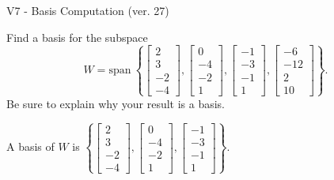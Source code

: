\begin{exercise}
  \begin{exerciseTitle}V7 - Basis Computation (ver. 27)\end{exerciseTitle}
  \begin{exerciseStatement}
    Find a basis for the subspace 
\[W=\mathrm{span}\ \left\{\left[\begin{array}{r}
2 \\
3 \\
-2 \\
-4
\end{array}\right] , \left[\begin{array}{r}
0 \\
-4 \\
-2 \\
1
\end{array}\right] , \left[\begin{array}{r}
-1 \\
-3 \\
-1 \\
1
\end{array}\right] , \left[\begin{array}{r}
-6 \\
-12 \\
2 \\
10
\end{array}\right]\right\}.\]
 Be sure to explain why your result is a basis.


  \end{exerciseStatement}
  \begin{exerciseAnswer}
   A basis of \(W\) is  \(\left\{\left[\begin{array}{r}
2 \\
3 \\
-2 \\
-4
\end{array}\right] , \left[\begin{array}{r}
0 \\
-4 \\
-2 \\
1
\end{array}\right] , \left[\begin{array}{r}
-1 \\
-3 \\
-1 \\
1
\end{array}\right]\right\}\).
  


  \end{exerciseAnswer}
\end{exercise}